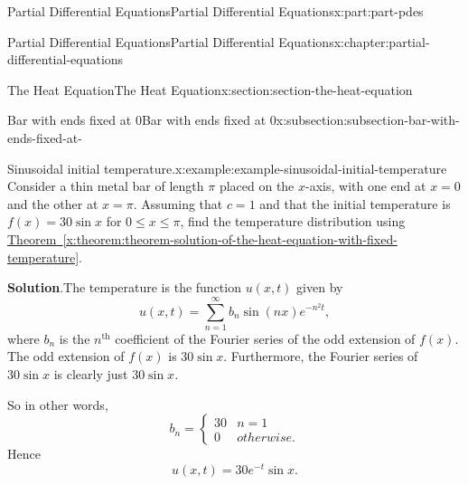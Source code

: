 \documentclass[oneside,10pt,]{book}
\newcommand{\blocktitlefont}{\relax}
\newcommand{\xreffont}{\relax}
\numberwithin{equation}{part}
\renewcommand{\th}{\text{th}}
\newcommand{\amp}{&}
\begin{document}
\begin{partptx}{Partial Differential Equations}{}{Partial Differential Equations}{}{}{x:part:part-pdes}
\begin{chapterptx}{Partial Differential Equations}{}{Partial Differential Equations}{}{}{x:chapter:partial-differential-equations}
\begin{sectionptx}{The Heat Equation}{}{The Heat Equation}{}{}{x:section:section-the-heat-equation}
\begin{subsectionptx}{Bar with ends fixed at \(0\)}{}{Bar with ends fixed at \(0\)}{}{}{x:subsection:subsection-bar-with-ends-fixed-at-}
\begin{example}{Sinusoidal initial temperature.}{x:example:example-sinusoidal-initial-temperature}
Consider a thin metal bar of length \(\pi\) placed on the \(x\)-axis, with one end at \(x=0\) and the other at \(x=\pi\). Assuming that \(c=1\) and that the initial temperature is \(f(x) = 30\sin x\) for \(0\leq x\leq\pi\), find the temperature distribution using \hyperref[x:theorem:theorem-solution-of-the-heat-equation-with-fixed-temperature]{Theorem~{\xreffont\ref{x:theorem:theorem-solution-of-the-heat-equation-with-fixed-temperature}}}.%
\par\smallskip%
\noindent\textbf{\blocktitlefont Solution}.\hypertarget{g:solution:idp105548780902816}{}\quad{}The temperature is the function \(u(x,t)\) given by%
\begin{equation*}
u(x,t) = \sum_{n=1}^{\infty}b_{n}\sin(n x)e^{-n^{2}t},
\end{equation*}
where \(b_{n}\) is the \(n^{\th}\) coefficient of the Fourier series of the odd extension of \(f(x)\). The odd extension of \(f(x)\) is \(30\sin x\). Furthermore, the Fourier series of \(30\sin x\) is clearly just \(30\sin x\).%
\par
So in other words,%
\begin{equation*}
b_{n} = \begin{cases} 30 \amp n=1 \\ 0 \amp otherwise.\end{cases}
\end{equation*}
Hence%
\begin{equation*}
u(x,t) = 30e^{-t}\sin x.
\end{equation*}
%
\end{example}
\end{subsectionptx}
\end{sectionptx}
\end{chapterptx}
  \end{partptx}
%
\appendix%
%
\end{document}

